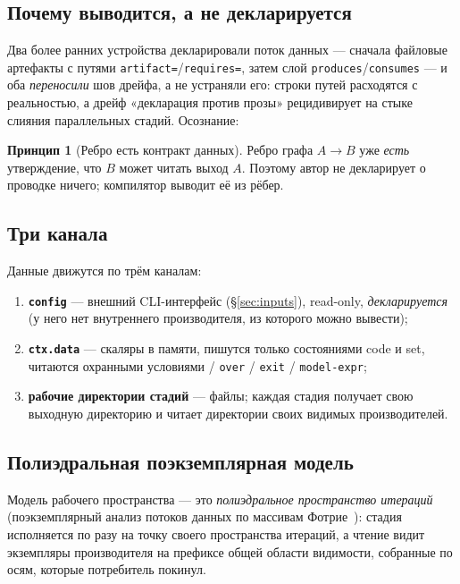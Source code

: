 \documentclass[11pt]{article}
\theoremstyle{plain}
\theoremstyle{definition}
\newtheorem{principle}[theorem]{Принцип}
\theoremstyle{remark}
\newcommand{\code}[1]{\texttt{#1}}
\newcommand{\state}[1]{\textsf{#1}}
\begin{document}
\subsection{Почему выводится, а не декларируется}

Два более ранних устройства декларировали поток данных --- сначала файловые артефакты с
путями \code{artifact=}/\code{requires=}, затем слой \code{produces}/\code{consumes} ---
и оба \emph{переносили} шов дрейфа, а не устраняли его: строки путей расходятся с
реальностью, а дрейф «декларация против прозы» рецидивирует на стыке слияния
параллельных стадий. Осознание:

\begin{principle}[Ребро есть контракт данных]\label{prin:edge}
Ребро графа $A \to B$ уже \emph{есть} утверждение, что $B$ может читать выход $A$. Поэтому
автор не декларирует о проводке ничего; компилятор выводит её из рёбер.
\end{principle}

\subsection{Три канала}

Данные движутся по трём каналам:
\begin{enumerate}[nosep]
  \item \textbf{\code{config}} --- внешний CLI-интерфейс (\S\ref{sec:inputs}), read-only,
        \emph{декларируется} (у него нет внутреннего производителя, из которого можно вывести);
  \item \textbf{\code{ctx.data}} --- скаляры в памяти, пишутся только состояниями
        \state{code} и \state{set}, читаются охранными условиями / \code{over} /
        \code{exit} / \code{model-expr};
  \item \textbf{рабочие директории стадий} --- файлы; каждая стадия получает свою выходную
        директорию и читает директории своих видимых производителей.
\end{enumerate}

\subsection{Полиэдральная поэкземплярная модель}

Модель рабочего пространства --- это \emph{полиэдральное пространство итераций}
(поэкземплярный анализ потоков данных по массивам Фотрие~\cite{feautrier}): стадия
исполняется по разу на точку своего пространства итераций, а чтение видит экземпляры
производителя на префиксе общей области видимости, собранные по осям, которые потребитель
покинул.
\end{document}
